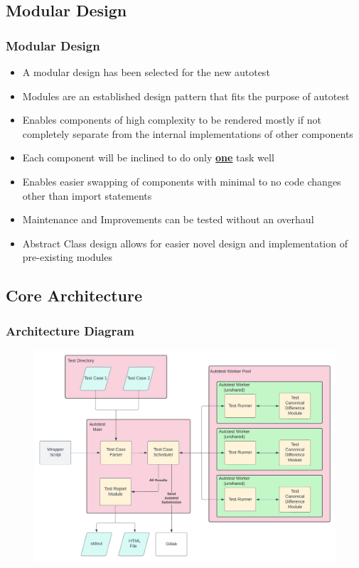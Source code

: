 \documentclass[xcolor, handout]{beamer}
\begin{document}
\subsection{Modular Design}
\begin{frame}
	\frametitle{Modular Design}
	\begin{itemize}
		\item A modular design has been selected for the new autotest
		\pause
		\item Modules are an established design pattern that fits the purpose of autotest
		\pause
		\item Enables components of high complexity to be rendered mostly if not completely separate from the internal implementations of other components
		\pause
		\item Each component will be inclined to do only \textbf{\underline{one}} task well
		\pause
		\item Enables easier swapping of components with minimal to no code changes other than import statements
		\pause
		\item Maintenance and Improvements can be tested without an overhaul
		\pause
		\item Abstract Class design allows for easier novel design and implementation of pre-existing modules
	\end{itemize}
\end{frame}
\subsection{Core Architecture}
\begin{frame}
	\frametitle{Architecture Diagram}
	\begin{figure}
		\includegraphics[width=\textwidth, height=0.85\textheight, keepaspectratio=true]{architecture}
	\end{figure}
\end{frame}
\end{document}
